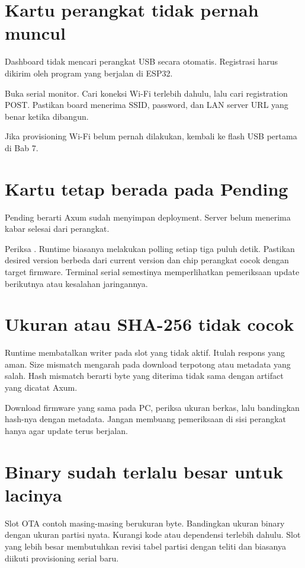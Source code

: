 \section{Kartu perangkat tidak pernah muncul}

Dashboard tidak mencari perangkat USB secara otomatis. Registrasi harus dikirim oleh program yang berjalan di ESP32.

Buka serial monitor. Cari koneksi Wi-Fi terlebih dahulu, lalu cari registration POST. Pastikan board menerima SSID, password, dan LAN server URL yang benar ketika dibangun.

Jika provisioning Wi-Fi belum pernah dilakukan, kembali ke flash USB pertama di Bab 7.

\section{Kartu tetap berada pada Pending}

Pending berarti Axum sudah menyimpan deployment. Server belum menerima kabar selesai dari perangkat.

Periksa . Runtime biasanya melakukan polling setiap tiga puluh detik. Pastikan desired version berbeda dari current version dan chip perangkat cocok dengan target firmware. Terminal serial semestinya memperlihatkan pemeriksaan update berikutnya atau kesalahan jaringannya.

\section{Ukuran atau SHA-256 tidak cocok}

Runtime membatalkan writer pada slot yang tidak aktif. Itulah respons yang aman. Size mismatch mengarah pada download terpotong atau metadata yang salah. Hash mismatch berarti byte yang diterima tidak sama dengan artifact yang dicatat Axum.

Download firmware yang sama pada PC, periksa ukuran berkas, lalu bandingkan hash-nya dengan metadata. Jangan membuang pemeriksaan di sisi perangkat hanya agar update terus berjalan.

\section{Binary sudah terlalu besar untuk lacinya}

Slot OTA contoh masing-masing berukuran  byte. Bandingkan ukuran binary dengan ukuran partisi nyata. Kurangi kode atau dependensi terlebih dahulu. Slot yang lebih besar membutuhkan revisi tabel partisi dengan teliti dan biasanya diikuti provisioning serial baru.

